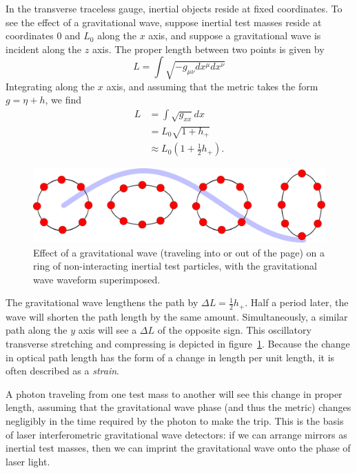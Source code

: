 In the transverse traceless gauge, inertial objects reside at fixed
coordinates.  To see the effect of a gravitational wave, suppose
inertial test masses reside at coordinates $0$ and $L_0$ along the $x$
axis, and suppose a gravitational wave is incident along the $z$ axis.
The proper length between two points is given by
\[
L = \int \sqrt{-g_{\mu\nu} dx^\mu dx^\nu}
\]
Integrating along the $x$ axis, and assuming that the metric takes
the form $g = \eta + h$, we find
\begin{align}
L & = \int \sqrt{g_{xx}} dx \\
  & = L_0 \sqrt{1 + h_+} \\
  & \approx L_0 \left(1 + \frac{1}{2} h_+\right).
\end{align}
\begin{figure}
\includegraphics[width=\columnwidth]{chapter1/figures/gwave.pdf}
\caption[Effect of a gravitational wave on a ring of test
  particles]{\label{fig:gwave-effect}Effect of a gravitational wave
  (traveling into or out of the page) on a ring of non-interacting
  inertial test particles, with the gravitational wave waveform 
  superimposed.}
\end{figure}
The gravitational wave lengthens the path by $\Delta L =
\frac{1}{2}h_+$. Half a period later, the wave will shorten the path
length by the same amount.  Simultaneously, a similar path along the
$y$ axis will see a $\Delta L$ of the opposite sign.  This oscillatory
transverse stretching and compressing is depicted in
figure~\ref{fig:gwave-effect}.  Because the change in optical path
length has the form of a change in length per unit length, it is often
described as a \emph{strain}.

A photon traveling from one test mass to another will see this change
in proper length, assuming that the gravitational wave phase (and thus
the metric) changes negligibly in the time required by the photon to
make the trip.  This is the basis of laser interferometric
gravitational wave detectors: if we can arrange mirrors as inertial
test masses, then we can imprint the gravitational wave onto the phase
of laser light.

